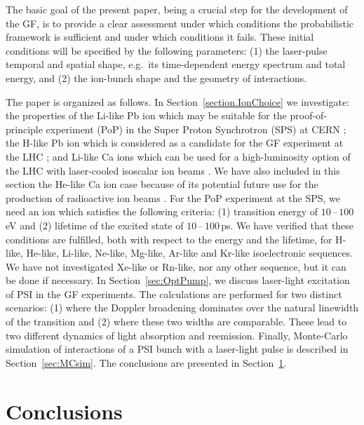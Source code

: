 \documentclass[superscriptaddress,
amsmath,amssymb%
pra,twocolumn,
floatfix
]{revtex4-2}
\begin{document}
The basic goal of the present paper, being a crucial step for the development of the GF, is to provide a clear assessment under which conditions the probabilistic framework is sufficient and under which conditions it fails.  These initial conditions will be specified by the following parameters: (1) the laser-pulse temporal and spatial shape, e.g.\ its time-dependent energy spectrum and total energy, and (2) the ion-bunch shape and the geometry of interactions. 

The paper is organized as follows. In Section~\ref{section.IonChoice} we investigate: the properties of the Li-like Pb ion which may be suitable for the proof-of-principle experiment (PoP) in the Super Proton Synchrotron (SPS) at CERN \cite{GF-PoP-LoI:2019}; the H-like Pb ion which is considered as a candidate for the GF experiment at the LHC \cite{Bessonov:1995eq}; and Li-like Ca ions which can be used for a high-luminosity option of the LHC with laser-cooled isoscalar ion beams \cite{Krasny:2020wgx,Krasny:2021llv}. We have also included in this section the He-like Ca ion case because of its potential future use for the production of radioactive ion beams \cite{Nichita:2021iwa}.  For the PoP experiment at the SPS, we need an ion which satisfies the following criteria: (1) transition energy of $10\,$--$\,100\,$eV and (2) lifetime of the excited state of $10\,$--$\,100\,$ps.
We have verified that these conditions are fulfilled, both with respect to the energy and the lifetime, for H-like, He-like, Li-like, Ne-like, Mg-like, Ar-like and Kr-like isoelectronic sequences.  We have not investigated Xe-like or Rn-like, nor any other sequence, but it can be done if necessary.  In Section~\ref{sec:OptPump}, we discuss laser-light excitation of PSI in the GF experiments. The calculations are performed for two distinct scenarios: (1) where the Doppler broadening dominates over the natural linewidth of the transition and (2) where these two widths are comparable. These lead to two different dynamics of light absorption and reemission.
Finally, Monte-Carlo simulation of interactions of a PSI bunch with a laser-light pulse is described in Section~\ref{sec:MCsim}.  The conclusions are presented in Section~\ref{sec:Concl}.



\section{Conclusions}
\label{sec:Concl}
\end{document}
